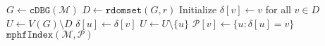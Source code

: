 \begin{algorithm}[!b]
	\begin{algorithmic}[1]
		\State $G\leftarrow \texttt{cDBG}(\mathcal{M})$\;
		\State $D\leftarrow \texttt{rdomset}(G, r)$\;
		\State Initialize $\delta[v] \leftarrow v$ for all $v \in D$\;
		\State $U \leftarrow V(G) \setminus D$
		\label{algstep:partition_start}
					\State $\delta[u] \leftarrow \delta[v]$\;
					\State $U \leftarrow U \setminus \{u\}$\;
				\EndFor
			\EndFor
		\EndWhile
 		\State $\mathcal{P}[v] \leftarrow \{u:\delta[u] = v\}$\;\label{algstep:partition_end}
		\State \Return $\texttt{mphfIndex}(\mathcal{M}, \mathcal{P})$ %
	\end{algorithmic}
	\caption{$\texttt{indexPieces}(\mathcal{M},r)$}\label{alg:index_pieces}
\end{algorithm}
